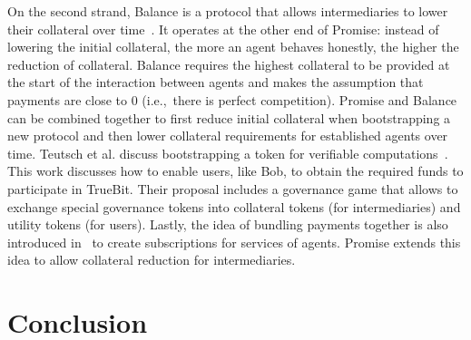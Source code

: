 \documentclass[runningheads]{llncs}
\newcommand{\sys}{Promise\xspace}
\newcommand{\todom}[1]{\todo[linecolor=green,backgroundcolor=green!25,bordercolor=green,inline,caption={}]{Todo for Dominik: #1}}
\begin{document}
On the second strand, Balance is a protocol that allows intermediaries to lower their collateral over time~\cite{Harz2019Balance}.
It operates at the other end of \sys: instead of lowering the initial collateral, the more an agent behaves honestly, the higher the reduction of collateral.
Balance requires the highest collateral to be provided at the start of the interaction between agents and makes the assumption that payments are close to 0 (i.e.,\ there is perfect competition).
\sys and Balance can be combined together to first reduce initial collateral when bootstrapping a new protocol and then lower collateral requirements for established agents over time.
Teutsch et al. discuss bootstrapping a token for verifiable computations~\cite{Teutsch2019Boostrap}.
This work discusses how to enable users, like Bob, to obtain the required funds to participate in TrueBit.
Their proposal includes a governance game that allows to exchange special governance tokens into collateral tokens (for intermediaries) and utility tokens (for users).
Lastly, the idea of bundling payments together is also introduced in~\cite{Berg2018} to create subscriptions for services of agents.
\sys extends this idea to allow collateral reduction for intermediaries.



\section{Conclusion}
\label{sec:conclusion}
\end{document}
